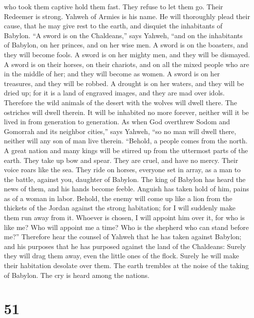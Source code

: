 who took them captive hold them fast. They refuse to let them go.
 Their Redeemer is strong. Yahweh of Armies is his name.
He will thoroughly plead their cause, that he may give rest to the
earth, and disquiet the inhabitants of Babylon.  ``A
sword is on the Chaldeans,'' says Yahweh, ``and on the inhabitants of
Babylon, on her princes, and on her wise men.  A sword is
on the boasters, and they will become fools. A sword is on her mighty
men, and they will be dismayed.  A sword is on their
horses, on their chariots, and on all the mixed people who are in the
middle of her; and they will become as women. A sword is on her
treasures, and they will be robbed.  A drought is on her
waters, and they will be dried up; for it is a land of engraved images,
and they are mad over idols.  Therefore the wild animals
of the desert with the wolves will dwell there. The ostriches will dwell
therein. It will be inhabited no more forever, neither will it be lived
in from generation to generation.  As when God overthrew
Sodom and Gomorrah and its neighbor cities,'' says Yahweh, ``so no man
will dwell there, neither will any son of man live therein.
 ``Behold, a people comes from the north. A great nation
and many kings will be stirred up from the uttermost parts of the earth.
 They take up bow and spear. They are cruel, and have no
mercy. Their voice roars like the sea. They ride on horses, everyone set
in array, as a man to the battle, against you, daughter of Babylon.
 The king of Babylon has heard the news of them, and his
hands become feeble. Anguish has taken hold of him, pains as of a woman
in labor.  Behold, the enemy will come up like a lion
from the thickets of the Jordan against the strong habitation; for I
will suddenly make them run away from it. Whoever is chosen, I will
appoint him over it, for who is like me? Who will appoint me a time? Who
is the shepherd who can stand before me?''  Therefore
hear the counsel of Yahweh that he has taken against Babylon; and his
purposes that he has purposed against the land of the Chaldeans: Surely
they will drag them away, even the little ones of the flock. Surely he
will make their habitation desolate over them.  The earth
trembles at the noise of the taking of Babylon. The cry is heard among
the nations.

\hypertarget{section-50}{%
\section{51}\label{section-50}}

